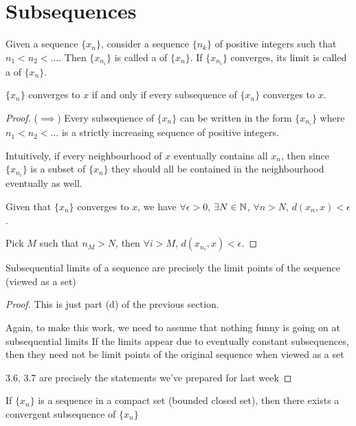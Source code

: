 \section{Subsequences}
\begin{definition}
Given a sequence $\{x_n\}$, consider a sequence $\{n_k\}$ of positive integers such that $n_1<n_2<\dots$. Then $\{x_{n_i}\}$ is called a  of $\{x_n\}$. If $\{x_{n_i}\}$ converges, its limit is called a  of $\{x_n\}$.
\end{definition}

\begin{proposition}
$\{x_n\}$ converges to $x$ if and only if every subsequence of $\{x_n\}$ converges to $x$.
\end{proposition}

\begin{proof}
($\implies$) Every subsequence of $\{x_n\}$ can be written in the form $\{x_{n_i}\}$ where $n_1<n_2<\dots$ is a strictly increasing sequence of positive integers.

Intuitively, if every neighbourhood of $x$ eventually contains all $x_n$, then since $\{x_{n_i}\}$ is a subset of $\{x_n\}$ they should all be contained in the neighbourhood eventually as well.

Given that $\{x_n\}$ converges to $x$, we have $\forall\epsilon>0$, $\exists N\in\mathbb N$, $\forall n>N$, $d(x_n,x)<\epsilon$.

Pick $M$ such that $n_M>N$, then $\forall i>M$, $d(x_{n_i},x)<\epsilon$.
\end{proof}

\begin{proposition}
Subsequential limits of a sequence are precisely the limit points of the sequence (viewed as a set)
\end{proposition}

\begin{proof}
This is just part (d) of the previous section.

Again, to make this work, we need to assume that nothing funny is going on at subsequential limits
If the limits appear due to eventually constant subsequences, then they need not be limit points of the original sequence when viewed as a set

3.6, 3.7 are precisely the statements we've prepared for last week
\end{proof}

\begin{proposition}
If $\{x_n\}$ is a sequence in a compact set (bounded closed set), then there exists a convergent subsequence of $\{x_n\}$
\end{proposition}

